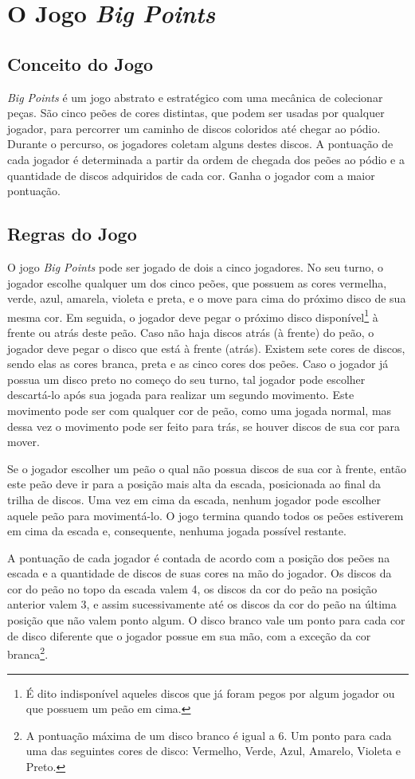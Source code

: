
\section{O Jogo \emph{Big Points}}
\subsection{Conceito do Jogo}
\label{subsec:conceito-do-jogo}
\emph{Big Points} é um jogo abstrato e estratégico com uma mecânica de colecionar peças. São cinco peões de cores distintas, que podem ser usadas por qualquer jogador, para percorrer um caminho de discos coloridos até chegar ao pódio. Durante o percurso, os jogadores coletam alguns destes discos. A pontuação de cada jogador é determinada a partir da ordem de chegada dos peões ao pódio e a quantidade de discos adquiridos de cada cor. Ganha o jogador com a maior pontuação.

\subsection{Regras do Jogo}
\label{subsec:regras-do-jogo}
O jogo \emph{Big Points} pode ser jogado de dois a cinco jogadores. No seu turno, o jogador escolhe qualquer um dos cinco peões, que possuem as cores vermelha, verde, azul, amarela, violeta e preta, e o move para cima do próximo disco de sua mesma cor. Em seguida, o jogador deve pegar o próximo disco disponível\footnote{É dito indisponível aqueles discos que já foram pegos por algum jogador ou que possuem um peão em cima.} à frente ou atrás deste peão. Caso não haja discos atrás (à frente) do peão, o jogador deve pegar o disco que está à frente (atrás). Existem sete cores de discos, sendo elas as cores branca, preta e as cinco cores dos peões. Caso o jogador já possua um disco preto no começo do seu turno, tal jogador pode escolher descartá-lo após sua jogada para realizar um segundo movimento. Este movimento pode ser com qualquer cor de peão, como uma jogada normal, mas dessa vez o movimento pode ser feito para trás, se houver discos de sua cor para mover.

Se o jogador escolher um peão o qual não possua discos de sua cor à frente, então este peão deve ir para a posição mais alta da escada, posicionada ao final da trilha de discos. Uma vez em cima da escada, nenhum jogador pode escolher aquele peão para movimentá-lo. O jogo termina quando todos os peões estiverem em cima da escada e, consequente, nenhuma jogada possível restante.

A pontuação de cada jogador é contada de acordo com a posição dos peões na escada e a quantidade de discos de suas cores na mão do jogador. Os discos da cor do peão no topo da escada valem 4, os discos da cor do peão na posição anterior valem 3, e assim sucessivamente até os discos da cor do peão na última posição que não valem ponto algum. O disco branco vale um ponto para cada cor de disco diferente que o jogador possue em sua mão, com a exceção da cor branca\footnote{A pontuação máxima de um disco branco é igual a 6. Um ponto para cada uma das seguintes cores de disco: Vermelho, Verde, Azul, Amarelo, Violeta e Preto.}.
